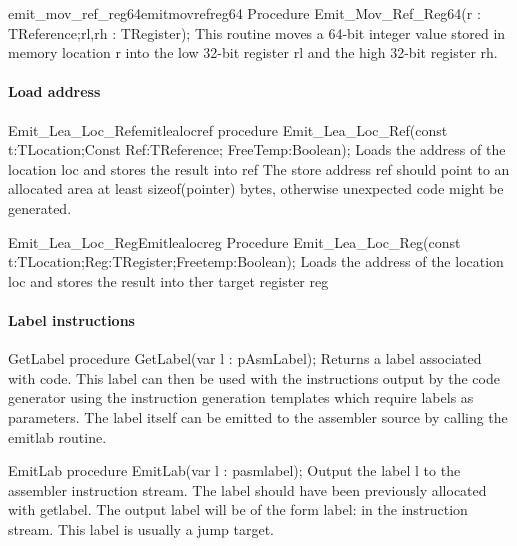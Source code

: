 \documentclass [12pt]{article}
\begin{document}
\begin{functionl}{emit{\_}mov{\_}ref{\_}reg64}{emitmovrefreg64}
\Declaration
Procedure Emit{\_}Mov{\_}Ref{\_}Reg64(r : TReference;rl,rh : TRegister);
\Description 
This routine moves a 64-bit integer value stored in memory location
\textsf{r} into the low 32-bit register \textsf{rl} and the high 32-bit
register \textsf{rh}. 
\end{functionl}

\paragraph{Load address}

\begin{functionl}{Emit{\_}Lea{\_}Loc{\_}Ref}{emitlealocref}
\Declaration
procedure Emit{\_}Lea{\_}Loc{\_}Ref(const t:TLocation;Const Ref:TReference; FreeTemp:Boolean);
\Description 
Loads the address of the location \textsf{loc }and stores the result into
\textsf{ref}
\Notes 
The store address \textsf{ref }should point to an allocated area at least
\textsf{sizeof(pointer)} bytes, otherwise unexpected code might be
generated. 
\end{functionl}

\begin{functionl}{Emit{\_}Lea{\_}Loc{\_}Reg}{Emitlealocreg}
\Declaration
Procedure Emit{\_}Lea{\_}Loc{\_}Reg(const t:TLocation;Reg:TRegister;Freetemp:Boolean);
\Description 
Loads the address of the location \textsf{loc }and stores the result into
ther target register \textsf{reg}
\end{functionl}

\paragraph{Label instructions}

\begin{procedure}{GetLabel}
\Declaration
procedure GetLabel(var l : pAsmLabel);
\Description 
Returns a label associated with code. This label can then be used with the
instructions output by the code generator using the instruction generation
templates which require labels as parameters. The label itself can be
emitted to the assembler source by calling the \textsf{emitlab} routine.
\end{procedure}

\begin{procedure}{EmitLab}
\Declaration
procedure EmitLab(var l : pasmlabel);
\Description 
Output the label \textsf{l }to the assembler instruction stream. 
\Notes 
The label should have been previously allocated with \textsf{getlabel.} The
output label will be of the form label: in the instruction stream. This
label is usually a jump target. 
\end{procedure}
\end{document}
